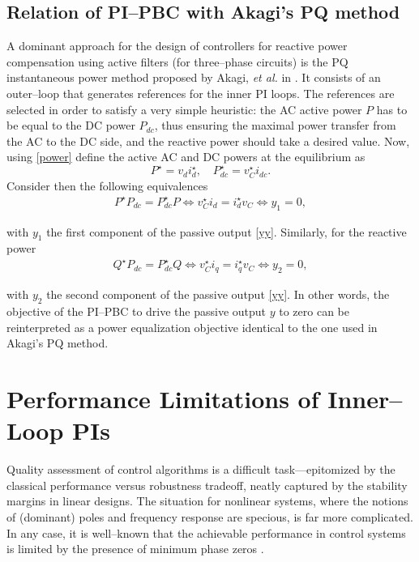 \documentclass[5p,twocolumn]{elsarticle}
\numberwithin{equation}{section}
\begin{document}
\subsection{Relation of PI--PBC with Akagi's PQ method }
\label{akamet}
A dominant approach for the design of controllers for reactive power compensation using active filters (for three--phase circuits) is the PQ instantaneous power method proposed by Akagi, {\em et al.} in
\cite{akagi}. It consists of an outer--loop that generates references for the inner PI loops. The references are selected in order to satisfy a very simple heuristic: the AC active power $P$ has to be equal to
the DC power $P_{dc}$, thus ensuring the maximal power transfer from the AC to the DC side, and the reactive power should take a desired value. Now, using  \eqref{power} define the active AC and DC powers at the equilibrium as
$$
P^\star=v_di_d^\star,\quad P_{dc}^\star=v_C^\star i_{dc}.
$$
Consider then the following equivalences
\begin{equation*}
\begin{aligned}
P^\star P_{dc}= P_{dc}^\star P   \Leftrightarrow v_C^\star i_d = i_d^\star v_C \Leftrightarrow  y_1 =0,
\end{aligned}
\end{equation*}

with $y_1$ the first component of the passive output  \eqref{yy}. Similarly, for the reactive power
\begin{equation*}
\begin{aligned}
Q^\star P_{dc}= P_{dc}^\star Q  \Leftrightarrow v_C^\star i_q = i_q^\star v_C \Leftrightarrow  y_2 =0,
\end{aligned}
\end{equation*}

with $y_2$ the second component of the passive output  \eqref{yy}. In other words, the objective of the PI--PBC to drive the passive output $y$ to zero can be reinterpreted as a power equalization objective
identical to the one used in Akagi's PQ method.

\section{Performance Limitations of Inner--Loop PIs}
\label{zdsection}
Quality assessment of control algorithms is a difficult task---epitomized by the classical performance versus robustness tradeoff, neatly captured by the stability margins in linear designs. The situation for
nonlinear systems, where the notions of (dominant) poles and frequency response are specious, is far more complicated. In any case, it is well--known that the achievable performance in control systems is
limited by the presence of minimum phase zeros \cite{FRAZAM,QIUDAV,SERetal}.
\end{document}
